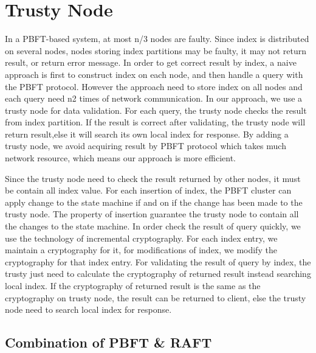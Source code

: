 \section{Trusty Node}
\vspace{-0.2cm}
In a PBFT-based system, at most n/3 nodes are faulty. Since index is distributed on several nodes, nodes storing
index partitions may be faulty, it may not return result, or return error message. In order to get correct result by index,
a naive approach is first to construct index on each node, and then handle a query with the PBFT protocol. However the
approach need to store index on all nodes and each query need n2 times of network communication. In our approach, we use a trusty node for data validation. For each query, the trusty node checks the result from index partition. If the result is correct after validating, the trusty node will return result,else it will search its own local index for response. By adding a trusty node, we avoid acquiring result by PBFT protocol which takes much network resource, which means our approach is more efficient.

Since the trusty node need to check the result returned by other nodes, it must be contain all index value. For each insertion of index, the PBFT cluster can apply change to the state machine if and on if the change has been made to the
trusty node. The property of insertion guarantee the trusty node to contain all the changes to the state machine. In
order check the result of query quickly, we use the technology of incremental cryptography. For each index entry, we
maintain a cryptography for it, for modifications of index, we modify the cryptography for that index entry. For validating the result of query by index, the trusty just need to calculate the cryptography of returned result instead searching local index. If the cryptography of returned result is the same as the cryptography on trusty node, the result can be
returned to client, else the trusty node need to search local index for response.


\subsection{Combination of PBFT \& RAFT}
\vspace{-0.2cm}

